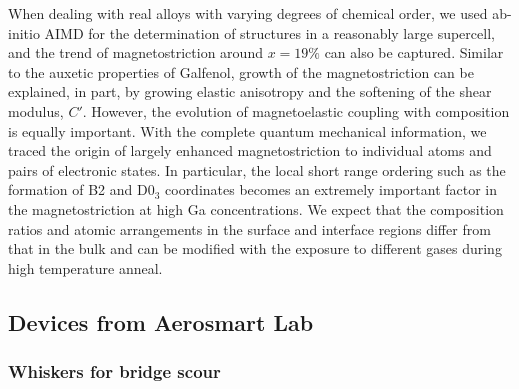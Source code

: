 When dealing with real alloys with varying degrees of chemical order, we used ab-initio AIMD for the determination of structures in a reasonably large supercell, and the trend of magnetostriction around $x=19\%$ can also be captured. Similar to the auxetic properties of Galfenol, growth of the magnetostriction can be explained, in part, by growing elastic anisotropy and the softening of the shear modulus, $C'$. However, the evolution of magnetoelastic coupling with composition is equally important. With the complete quantum mechanical information, we traced the origin of largely enhanced magnetostriction to individual atoms and pairs of electronic states. In particular, the local short range ordering such as the formation of B2 and D0$_{3}$ coordinates becomes an extremely important factor in the magnetostriction at high Ga concentrations. We expect that the composition ratios and atomic arrangements in the surface and interface regions differ from that in the bulk and can be modified with the exposure to different gases during high temperature anneal. 

%

\subsection{Devices from Aerosmart Lab}

\subsubsection{Whiskers for bridge scour}

